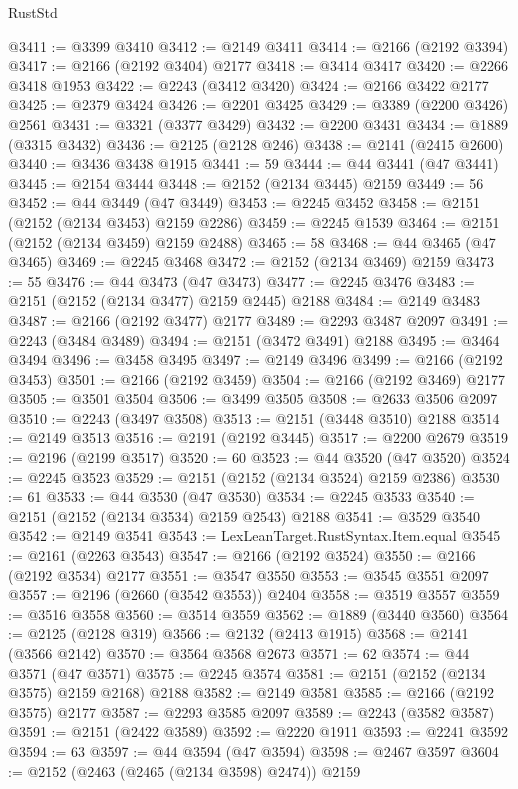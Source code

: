 \begin{lexlean}{RustStd}
\begin{coremodule}
@3411 := @3399 @3410
@3412 := @2149 @3411
@3414 := @2166 (@2192 @3394)
@3417 := @2166 (@2192 @3404) @2177
@3418 := @3414 @3417
@3420 := @2266 @3418 @1953
@3422 := @2243 (@3412 @3420)
@3424 := @2166 @3422 @2177
@3425 := @2379 @3424
@3426 := @2201 @3425
@3429 := @3389 (@2200 @3426) @2561
@3431 := @3321 (@3377 @3429)
@3432 := @2200 @3431
@3434 := @1889 (@3315 @3432)
@3436 := @2125 (@2128 @246)
@3438 := @2141 (@2415 @2600)
@3440 := @3436 @3438 @1915
@3441 := 59
@3444 := @44 @3441 (@47 @3441)
@3445 := @2154 @3444
@3448 := @2152 (@2134 @3445) @2159
@3449 := 56
@3452 := @44 @3449 (@47 @3449)
@3453 := @2245 @3452
@3458 := @2151 (@2152 (@2134 @3453) @2159 @2286)
@3459 := @2245 @1539
@3464 := @2151 (@2152 (@2134 @3459) @2159 @2488)
@3465 := 58
@3468 := @44 @3465 (@47 @3465)
@3469 := @2245 @3468
@3472 := @2152 (@2134 @3469) @2159
@3473 := 55
@3476 := @44 @3473 (@47 @3473)
@3477 := @2245 @3476
@3483 := @2151 (@2152 (@2134 @3477) @2159 @2445) @2188
@3484 := @2149 @3483
@3487 := @2166 (@2192 @3477) @2177
@3489 := @2293 @3487 @2097
@3491 := @2243 (@3484 @3489)
@3494 := @2151 (@3472 @3491) @2188
@3495 := @3464 @3494
@3496 := @3458 @3495
@3497 := @2149 @3496
@3499 := @2166 (@2192 @3453)
@3501 := @2166 (@2192 @3459)
@3504 := @2166 (@2192 @3469) @2177
@3505 := @3501 @3504
@3506 := @3499 @3505
@3508 := @2633 @3506 @2097
@3510 := @2243 (@3497 @3508)
@3513 := @2151 (@3448 @3510) @2188
@3514 := @2149 @3513
@3516 := @2191 (@2192 @3445)
@3517 := @2200 @2679
@3519 := @2196 (@2199 @3517)
@3520 := 60
@3523 := @44 @3520 (@47 @3520)
@3524 := @2245 @3523
@3529 := @2151 (@2152 (@2134 @3524) @2159 @2386)
@3530 := 61
@3533 := @44 @3530 (@47 @3530)
@3534 := @2245 @3533
@3540 := @2151 (@2152 (@2134 @3534) @2159 @2543) @2188
@3541 := @3529 @3540
@3542 := @2149 @3541
@3543 := LexLeanTarget.RustSyntax.Item.equal
@3545 := @2161 (@2263 @3543)
@3547 := @2166 (@2192 @3524)
@3550 := @2166 (@2192 @3534) @2177
@3551 := @3547 @3550
@3553 := @3545 @3551 @2097
@3557 := @2196 (@2660 (@3542 @3553)) @2404
@3558 := @3519 @3557
@3559 := @3516 @3558
@3560 := @3514 @3559
@3562 := @1889 (@3440 @3560)
@3564 := @2125 (@2128 @319)
@3566 := @2132 (@2413 @1915)
@3568 := @2141 (@3566 @2142)
@3570 := @3564 @3568 @2673
@3571 := 62
@3574 := @44 @3571 (@47 @3571)
@3575 := @2245 @3574
@3581 := @2151 (@2152 (@2134 @3575) @2159 @2168) @2188
@3582 := @2149 @3581
@3585 := @2166 (@2192 @3575) @2177
@3587 := @2293 @3585 @2097
@3589 := @2243 (@3582 @3587)
@3591 := @2151 (@2422 @3589)
@3592 := @2220 @1911
@3593 := @2241 @3592
@3594 := 63
@3597 := @44 @3594 (@47 @3594)
@3598 := @2467 @3597
@3604 := @2152 (@2463 (@2465 (@2134 @3598) @2474)) @2159

\end{coremodule}
\end{lexlean}
